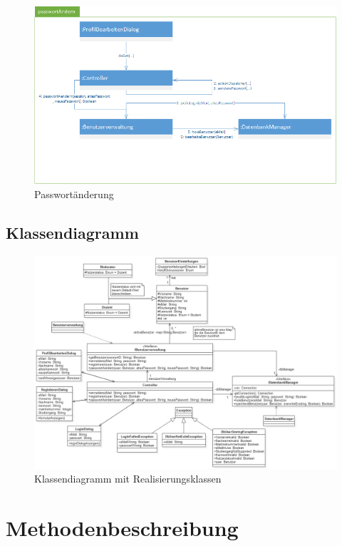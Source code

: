 \documentclass[12pt]{scrreprt}
\begin{document}
\begin{figure}[h]
\centering
\includegraphics[width=\linewidth]{Bilder/Kommunikationsdiagramme/passwortAendern}
\caption{Passwortänderung}
\label{Passwortaenderung}
\end{figure}

\begin{landscape}
\section{Klassendiagramm}
\begin{figure}[!h]
\centering
\includegraphics[width=\textwidth]{Bilder/Klassendiagramm/Klassendiagramm}
\caption{Klassendiagramm mit Realisierungsklassen}
\label{fig:Klassendiagramm}
\end{figure}
\end{landscape}

\section{Methodenbeschreibung}
\end{document}

